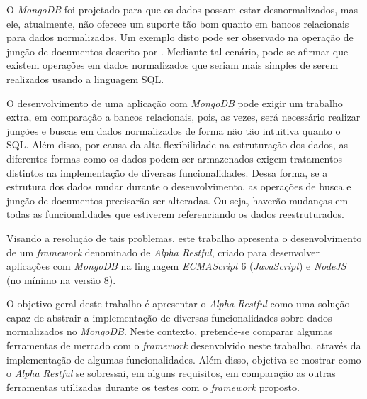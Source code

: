 O \textit{MongoDB} foi projetado para que os dados possam estar desnormalizados, mas ele, atualmente, não oferece um suporte tão bom quanto em bancos relacionais para dados normalizados. Um exemplo disto pode ser observado na operação de junção de documentos descrito por . Mediante tal cenário, pode-se afirmar que existem operações em dados normalizados que seriam mais simples de serem realizados usando a linguagem SQL.


O desenvolvimento de uma aplicação com \textit{MongoDB} pode exigir um trabalho extra, em comparação a bancos relacionais, pois, as vezes, será necessário realizar junções e buscas em dados normalizados de forma não tão intuitiva quanto o SQL. Além disso, por causa da alta flexibilidade na estruturação dos dados, as diferentes formas como os dados podem ser armazenados exigem tratamentos distintos na implementação de diversas funcionalidades. Dessa forma, se a estrutura dos dados mudar durante o desenvolvimento, as operações de busca e junção de documentos precisarão ser alteradas. Ou seja, haverão mudanças em todas as funcionalidades que estiverem referenciando os dados reestruturados.


Visando a resolução de tais problemas, este trabalho apresenta o desenvolvimento de um \textit{framework} denominado de \textit{Alpha Restful}, criado para desenvolver aplicações com \textit{MongoDB} na linguagem \textit{ECMAScript} 6 (\textit{JavaScript}) e \textit{NodeJS} (no mínimo na versão 8).


O objetivo geral deste trabalho é apresentar o \textit{Alpha Restful} como uma solução capaz de abstrair a implementação de diversas funcionalidades sobre dados normalizados no \textit{MongoDB}. Neste contexto, pretende-se comparar algumas ferramentas de mercado com o \textit{framework} desenvolvido neste trabalho, através da implementação de algumas funcionalidades. Além disso, objetiva-se mostrar como o \textit{Alpha Restful}
se sobressai, em alguns requisitos, em comparação as outras ferramentas utilizadas durante os testes com o \textit{framework} proposto.


